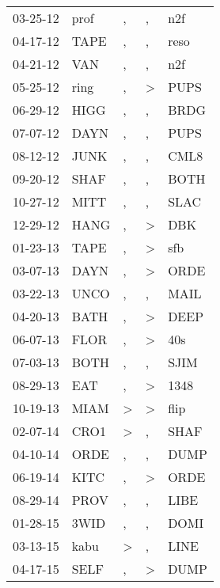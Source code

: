 \begin{supertabular}{lllll}
 03-25-12 &  prof &                , &             , &   n2f \\
 04-17-12 &  TAPE &                , &             , &  reso \\
 04-21-12 &   VAN &                , &             , &   n2f \\
 05-25-12 &  ring &                , &  \textgreater &  PUPS \\
 06-29-12 &  HIGG &                , &             , &  BRDG \\
 07-07-12 &  DAYN &                , &             , &  PUPS \\
 08-12-12 &  JUNK &                , &             , &  CML8 \\
 09-20-12 &  SHAF &                , &             , &  BOTH \\
 10-27-12 &  MITT &                , &             , &  SLAC \\
 12-29-12 &  HANG &                , &  \textgreater &   DBK \\
 01-23-13 &  TAPE &                , &  \textgreater &   sfb \\
 03-07-13 &  DAYN &                , &  \textgreater &  ORDE \\
 03-22-13 &  UNCO &                , &             , &  MAIL \\
 04-20-13 &  BATH &                , &  \textgreater &  DEEP \\
 06-07-13 &  FLOR &                , &  \textgreater &   40s \\
 07-03-13 &  BOTH &                , &             , &  SJIM \\
 08-29-13 &   EAT &                , &  \textgreater &  1348 \\
 10-19-13 &  MIAM &     \textgreater &  \textgreater &  flip \\
 02-07-14 &  CRO1 &     \textgreater &             , &  SHAF \\
 04-10-14 &  ORDE &                , &             , &  DUMP \\
 06-19-14 &  KITC &                , &  \textgreater &  ORDE \\
 08-29-14 &  PROV &                , &             , &  LIBE \\
 01-28-15 &  3WID &                , &             , &  DOMI \\
 03-13-15 &  kabu &     \textgreater &             , &  LINE \\
 04-17-15 &  SELF &                , &  \textgreater &  DUMP \\

\end{supertabular}
